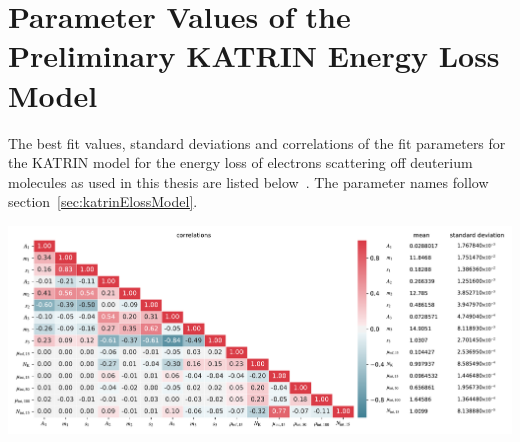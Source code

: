 \section{Parameter Values of the Preliminary KATRIN Energy Loss Model}
\label{sec:appendixKatrinElossElossModelParams}
The best fit values, standard deviations and correlations of the fit parameters for the KATRIN model for the energy loss of electrons scattering off deuterium molecules as used in this thesis are listed below~\cite{Hannen2019_1}. The parameter names follow section~\ref{sec:katrinElossModel}.

\includegraphics[width=\textwidth]{chapter/sensitivityStudyWithPreliminaryKatrinElossModel/appendix/fig/katrinElossParamValues.pdf}